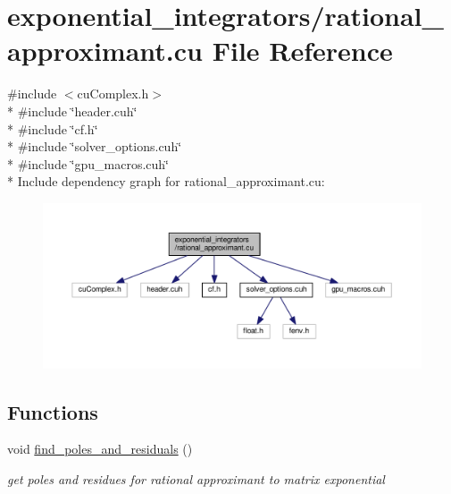 \hypertarget{rational__approximant_8cu}{}\section{exponential\+\_\+integrators/rational\+\_\+approximant.cu File Reference}
\label{rational__approximant_8cu}
{\ttfamily \#include $<$cu\+Complex.\+h$>$}\\*
{\ttfamily \#include \char`\"{}header.\+cuh\char`\"{}}\\*
{\ttfamily \#include \char`\"{}cf.\+h\char`\"{}}\\*
{\ttfamily \#include \char`\"{}solver\+\_\+options.\+cuh\char`\"{}}\\*
{\ttfamily \#include \char`\"{}gpu\+\_\+macros.\+cuh\char`\"{}}\\*
Include dependency graph for rational\+\_\+approximant.\+cu\+:\nopagebreak
\begin{figure}[H]
\begin{center}
\leavevmode
\includegraphics[width=350pt]{rational__approximant_8cu__incl}
\end{center}
\end{figure}
\subsection*{Functions}
\begin{DoxyCompactItemize}
\item 
void \hyperlink{rational__approximant_8cu_a1cb9bed79a1ce457c891851da0cec0ba}{find\+\_\+poles\+\_\+and\+\_\+residuals} ()
\begin{DoxyCompactList}\small\item\em get poles and residues for rational approximant to matrix exponential \end{DoxyCompactList}\end{DoxyCompactItemize}
